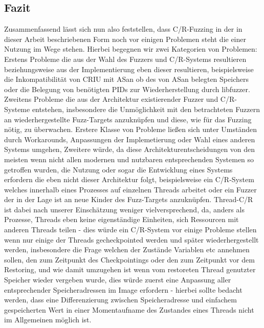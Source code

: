 \documentclass[a4paper]{article}
\begin{document}
\subsection{Fazit}
Zusammenfassend lässt sich nun also feststellen, dass C/R-Fuzzing in der in dieser Arbeit beschriebenen Form noch vor einigen Problemen steht die einer Nutzung im Wege stehen. 
Hierbei begegnen wir zwei Kategorien von Problemen: Erstens Probleme die aus der Wahl des Fuzzers und C/R-Systems resultieren beziehungsweise aus der Implementierung eben dieser resultieren, beispielsweise die Inkompatibilität von CRIU mit ASan ob des von ASan belegten Speichers oder die Belegung von benötigten PIDs zur Wiederherstellung durch libfuzzer. 
Zweitens Probleme die aus der Architektur existierender Fuzzer und C/R-Systeme entstehen, insbesondere die Unmöglichkeit mit den betrachteten Fuzzern an wiederhergestellte Fuzz-Targets anzuknüpfen und diese, wie für das Fuzzing nötig, zu überwachen. 
Erstere Klasse von Probleme ließen sich unter Umständen durch Workarounds, Anpassungen der Implemetierung oder Wahl eines anderen Systems umgehen, Zweitere würde, da diese Architekturentscheidungen von den meisten wenn nicht allen modernen und nutzbaren entsprechenden Systemen so getroffen wurden, die Nutzung oder sogar die Entwicklung eines Systems erfordern die eben nicht dieser Architektur folgt, beispielsweise ein C/R-System welches innerhalb eines Prozesses auf einzelnen Threads arbeitet oder ein Fuzzer der in der Lage ist an neue Kinder des Fuzz-Targets anzuknüpfen. Thread-C/R ist dabei nach unserer Einschätzung weniger vielversprechend, da, anders als Prozesse, Threads eben keine eigenständige Einheiten, sich Ressourcen mit anderen Threads teilen - dies würde ein C/R-System vor einige Probleme stellen wenn nur einige der Threads gecheckpointed werden und später wiederhergestellt werden, insbesondere die Frage welchen der Zustände Variablen etc annehmen sollen, den zum Zeitpunkt des Checkpointings oder den zum Zeitpunkt vor dem Restoring,  und wie damit umzugehen ist wenn vom restoreten Thread genutzter Speicher wieder vergeben wurde, dies würde zuerst eine Anpassung aller entsprechender Speicheradressen im Image erfordern - hierbei sollte bedacht werden, dass eine Differenzierung zwischen Speicheradresse und einfachem gespeicherten Wert in einer Momentaufname des Zustandes eines Threads nicht im Allgemeinen möglich ist.\\
\end{document}
